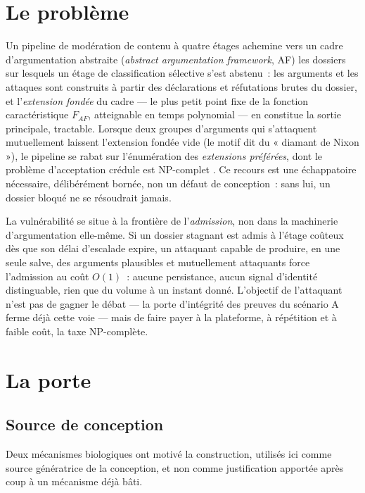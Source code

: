 \documentclass[11pt]{article}
\begin{document}
\section{Le problème}
\label{sec:problem}

Un pipeline de modération de contenu à quatre étages achemine vers un
cadre d'argumentation abstraite (\emph{abstract argumentation framework},
AF) \cite{dung1995} les dossiers sur lesquels un étage de classification
sélective s'est abstenu~: les arguments et les attaques sont construits
à partir des déclarations et réfutations brutes du dossier, et
l'\emph{extension fondée} du cadre --- le plus petit point fixe de la
fonction caractéristique $F_{AF}$, atteignable en temps polynomial --- en
constitue la sortie principale, tractable. Lorsque deux groupes
d'arguments qui s'attaquent mutuellement laissent l'extension fondée vide
(le motif dit du « diamant de Nixon »), le pipeline se rabat sur
l'énumération des \emph{extensions préférées}, dont le problème
d'acceptation crédule est NP-complet \cite{fichte2024}. Ce recours est
une échappatoire nécessaire, délibérément bornée, non un défaut de
conception~: sans lui, un dossier bloqué ne se résoudrait jamais.

La vulnérabilité se situe à la frontière de l'\emph{admission}, non dans
la machinerie d'argumentation elle-même. Si un dossier stagnant est admis
à l'étage coûteux dès que son délai d'escalade expire, un attaquant
capable de produire, en une seule salve, des arguments plausibles et
mutuellement attaquants force l'admission au coût $O(1)$~: aucune
persistance, aucun signal d'identité distinguable, rien que du volume à
un instant donné. L'objectif de l'attaquant n'est pas de gagner le
débat --- la porte d'intégrité des preuves du scénario A ferme déjà
cette voie \cite{specA} --- mais de faire payer à la plateforme, à
répétition et à faible coût, la taxe NP-complète.

\section{La porte}
\label{sec:gate}

\subsection{Source de conception}

Deux mécanismes biologiques ont motivé la construction, utilisés ici
comme source génératrice de la conception, et non comme justification
apportée après coup à un mécanisme déjà bâti.
\end{document}
